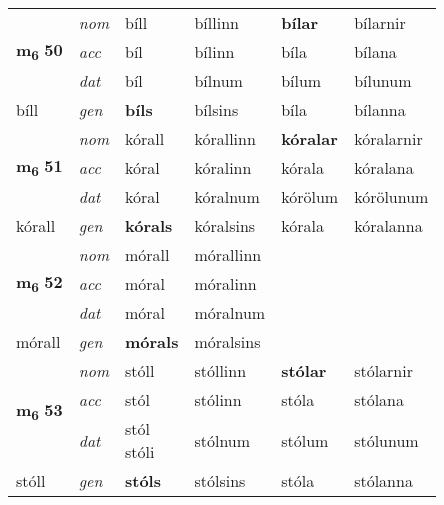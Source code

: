 \begin{longtable}[l]{llllll}
\multirow{3}{*}{{{\textbf{m{\textsubscript{6}}} \Large{\textbf{50}}}}}  & {\footnotesize{{\textit{nom}}}} & bíll & bíllinn    & \textbf{bílar} & bílarnir  \\*
 &  {\footnotesize{{\textit{acc}}}} & bíl  & bílinn   & bíla  & bílana \\*
 &  {\footnotesize{{\textit{dat}}}} & bíl & bílnum   & bílum & bílunum \\*
 {\footnotesize{bíll}} &   {\footnotesize{{\textit{gen}}}} & \textbf{bíls}  & bílsins  & bíla & bílanna \\
\cmidrule{1-6}


\multirow{3}{*}{{{\textbf{m{\textsubscript{6}}} \Large{\textbf{51}}}}}  & {\footnotesize{{\textit{nom}}}} & kórall & kórallinn    & \textbf{kóralar} & kóralarnir  \\*
 &  {\footnotesize{{\textit{acc}}}} & kóral  & kóralinn   & kórala  & kóralana \\*
 &  {\footnotesize{{\textit{dat}}}} & kóral & kóralnum   & kórölum & kórölunum \\*
 {\footnotesize{kórall}} &   {\footnotesize{{\textit{gen}}}} & \textbf{kórals}  & kóralsins  & kórala & kóralanna \\
\cmidrule{1-6}


\multirow{3}{*}{{{\textbf{m{\textsubscript{6}}} \Large{\textbf{52}}}}}  & {\footnotesize{{\textit{nom}}}} & mórall & mórallinn    & \textbf{} &   \\*
 &  {\footnotesize{{\textit{acc}}}} & móral  & móralinn   &   &  \\*
 &  {\footnotesize{{\textit{dat}}}} & móral & móralnum   &  &  \\*
 {\footnotesize{mórall}} &   {\footnotesize{{\textit{gen}}}} & \textbf{mórals}  & móralsins  &  &  \\
\cmidrule{1-6}


\multirow{3}{*}{{{\textbf{m{\textsubscript{6}}} \Large{\textbf{53}}}}}  & {\footnotesize{{\textit{nom}}}} & stóll & stóllinn    & \textbf{stólar} & stólarnir  \\*
 &  {\footnotesize{{\textit{acc}}}} & stól  & stólinn   & stóla  & stólana \\*
 &  {\footnotesize{{\textit{dat}}}} & \specialcell{stól\\ stóli} & stólnum   & stólum & stólunum \\*
 {\footnotesize{stóll}} &   {\footnotesize{{\textit{gen}}}} & \textbf{stóls}  & stólsins  & stóla & stólanna \\
\cmidrule{1-6}



\end{longtable}
